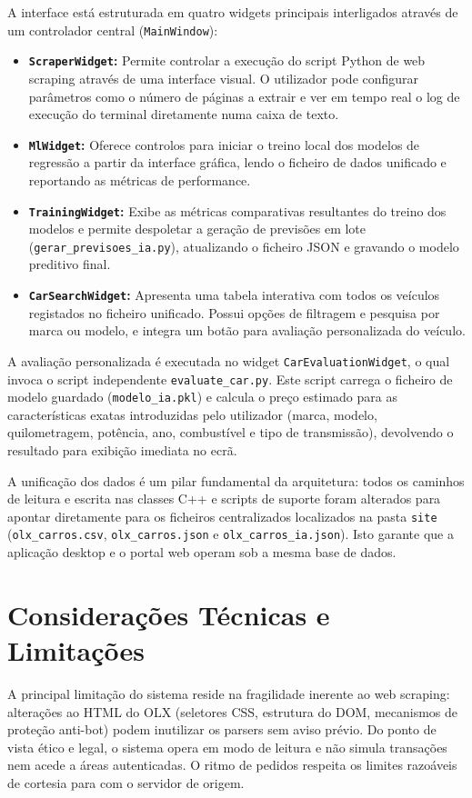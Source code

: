 \documentclass[11pt,a4paper]{article}
\begin{document}
A interface está estruturada em quatro widgets principais interligados através de um controlador central (\texttt{MainWindow}):
\begin{itemize}
    \item \textbf{\texttt{ScraperWidget}:} Permite controlar a execução do script Python de web scraping através de uma interface visual. O utilizador pode configurar parâmetros como o número de páginas a extrair e ver em tempo real o log de execução do terminal diretamente numa caixa de texto.
    \item \textbf{\texttt{MlWidget}:} Oferece controlos para iniciar o treino local dos modelos de regressão a partir da interface gráfica, lendo o ficheiro de dados unificado e reportando as métricas de performance.
    \item \textbf{\texttt{TrainingWidget}:} Exibe as métricas comparativas resultantes do treino dos modelos e permite despoletar a geração de previsões em lote (\texttt{gerar\_previsoes\_ia.py}), atualizando o ficheiro JSON e gravando o modelo preditivo final.
    \item \textbf{\texttt{CarSearchWidget}:} Apresenta uma tabela interativa com todos os veículos registados no ficheiro unificado. Possui opções de filtragem e pesquisa por marca ou modelo, e integra um botão para avaliação personalizada do veículo.
\end{itemize}

A avaliação personalizada é executada no widget \texttt{CarEvaluationWidget}, o qual invoca o script independente \texttt{evaluate\_car.py}. Este script carrega o ficheiro de modelo guardado (\texttt{modelo\_ia.pkl}) e calcula o preço estimado para as características exatas introduzidas pelo utilizador (marca, modelo, quilometragem, potência, ano, combustível e tipo de transmissão), devolvendo o resultado para exibição imediata no ecrã.

A unificação dos dados é um pilar fundamental da arquitetura: todos os caminhos de leitura e escrita nas classes C++ e scripts de suporte foram alterados para apontar diretamente para os ficheiros centralizados localizados na pasta \texttt{site} (\texttt{olx\_carros.csv}, \texttt{olx\_carros.json} e \texttt{olx\_carros\_ia.json}). Isto garante que a aplicação desktop e o portal web operam sob a mesma base de dados.

\section{Considerações Técnicas e Limitações}
A principal limitação do sistema reside na fragilidade inerente ao web scraping: alterações ao HTML do OLX (seletores CSS, estrutura do DOM, mecanismos de proteção anti-bot) podem inutilizar os parsers sem aviso prévio. Do ponto de vista ético e legal, o sistema opera em modo de leitura e não simula transações nem acede a áreas autenticadas. O ritmo de pedidos respeita os limites razoáveis de cortesia para com o servidor de origem.
\end{document}
